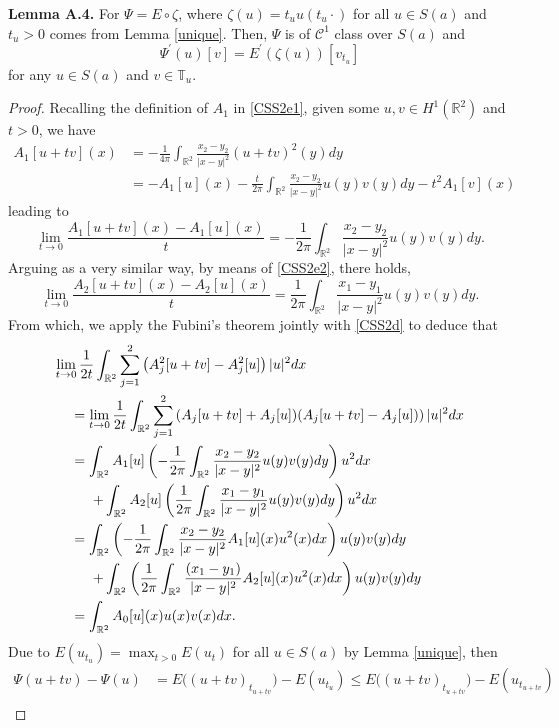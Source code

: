 \documentclass[11pt]{amsart}
\numberwithin{equation}{section}
\theoremstyle{definition}
\newcommand{\R}{\mathbb{R}}
\begin{document}
\noindent \textbf{Lemma A.4.}
For $\Psi= E\circ \zeta$, where $\zeta(u)=t_uu(t_u\cdot)$ for all $u\in S(a)$
and $t_u>0$ comes from Lemma \ref{unique}. Then, $\Psi$ is of $\mathcal{C}^1$ class over $S(a)$
and
\[
\Psi^\prime(u)[v]  =E^\prime(\zeta(u))[v_{t_u}]
\]
for any $u\in S(a)$ and $v\in \mathbb{T}_u$.

\begin{proof}
Recalling the definition of $A_1$ in \eqref{CSS2e1}, given some $u,v\in H^1(\R^2)$ and $t>0$, we have
\begin{align*}
  A_1[u+tv](x) & =-\frac{1}{4\pi }\int_{\R^2}\frac{ x_2-y_2 }{|x-y|^2}(u+tv)^2(y)dy \\
    & =-A_1[u](x)-\frac t{2\pi}\int_{\R^2}\frac{x_2-y_2}{|x-y|^2}u(y)v(y)dy-t^2A_1[v](x)
\end{align*}
leading to
\[
\lim_{t\to0} \frac{A_1[u+tv](x)-A_1[u](x)}{t}=-\frac 1{2\pi}\int_{\R^2}\frac{x_2-y_2}{|x-y|^2}u(y)v(y)dy.
\]
Arguing as a very similar way, by means of \eqref{CSS2e2},  there holds,
\[
\lim_{t\to0} \frac{A_2[u+tv](x)-A_2[u](x)}{t}= \frac 1{2\pi}\int_{\R^2}\frac{ x_1-y_1 }{|x-y|^2}u(y)v(y)dy.
\]
From which, we apply the Fubini's theorem jointly with \eqref{CSS2d} to deduce that
\[\begin{gathered}
\lim_{t\to0}\frac{1}{2t}\int_{\R^2}\sum_{j=1}^2\left(A_j^2[u+tv] -A_j^2[u] \right)|u|^2dx\hfill\\
\ \ \ \   =\lim_{t\to0}\frac{1}{2t}\int_{\R^2}\sum_{j=1}^2\left(A_j [u+tv] +A_j[u])(A_j [u+tv]-A_j[u]) \right)|u|^2dx\hfill\\
\ \ \ \ = \int_{\R^2}A_1[u]\left(-\frac 1{2\pi}\int_{\R^2}\frac{ x_2-y_2 }{|x-y|^2}u(y)v(y)dy\right)u^2dx\hfill\\
\ \ \ \ \ \ \ \   + \int_{\R^2}A_2[u]\left(\frac 1{2\pi}\int_{\R^2}\frac{ x_1-y_1 }{|x-y|^2}u(y)v(y)dy\right)u^2dx\hfill\\
\ \ \ \ = \int_{\R^2}\left(-\frac 1{2\pi}\int_{\R^2}\frac{ x_2-y_2 }{|x-y|^2}A_1[u](x)u^2(x)dx\right)  u(y)v(y)dy\hfill\\
\ \ \ \ \ \ \ \   + \int_{\R^2}\left(\frac 1{2\pi}\int_{\R^2}\frac{(x_1-y_1)}{|x-y|^2}A_2[u](x)u^2(x)dx\right)u(y)v(y)dy\hfill\\
\ \ \ \   = \int_{\R^2}A_0[u](x)u(x)v(x) dx.\hfill\\
\end{gathered}
\]
Due to $E(u_{t_u})=\max_{t>0}E(u_t)$ for all $u\in S(a)$ by Lemma \ref{unique},
then
\begin{align*}
\Psi(u+tv)-\Psi (u) & =E\big( (u+tv)_{t_{u+tv}} \big)-E(u_{t_u})
\leq E\big( (u+tv)_{t_{u+tv}}\big)-E(u_{t_{u+tv}}) \\

\end{align*}
\end{proof}
\end{document}
